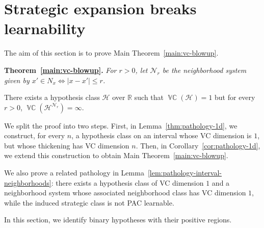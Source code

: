 \documentclass[11pt]{article}
\theoremstyle{plain}
\theoremstyle{definition}
\theoremstyle{remark}
\newenvironment{restatedtheorem}[1]
  {\par\noindent\textbf{Theorem~\ref{#1}.}\itshape}
  {\par}
\DeclareMathOperator{\VCdim}{\mathbb{VC}}
\begin{document}
\section{Strategic expansion breaks learnability}
\label{app:learnability_breaks}


The aim of this section is to prove Main Theorem~\ref{main:vc-blowup}.

\begin{restatedtheorem}{main:vc-blowup}
For $r > 0$, let $\mathcal{N}_r$ be the neighborhood system given by $x' \in  N_{x} \iff |x - x'| \leq r$.

There exists a hypothesis class $\mathcal{H}$ over $\mathbb R$ such that $\VCdim(\mathcal H) = 1$ but for every $r > 0$, $\VCdim(\mathcal H^{\mathcal N_r}) = \infty$.
\end{restatedtheorem}

We split the proof into two steps. First, in
Lemma~\ref{thm:pathology-1d}, we construct, for every \(n\), a hypothesis class
on an interval whose VC dimension is \(1\), but whose thickening has VC
dimension \(n\). Then, in Corollary~\ref{cor:pathology-1d}, we extend this
construction to obtain Main Theorem~\ref{main:vc-blowup}.

We also prove a related pathology in
Lemma~\ref{lem:pathology-interval-neighborhoods}: there exists a hypothesis class
of VC dimension \(1\) and a neighborhood system whose associated neighborhood
class has VC dimension \(1\), while the induced strategic class is not
PAC learnable.  


In this section, we identify binary hypotheses with their positive regions.
\end{document}
